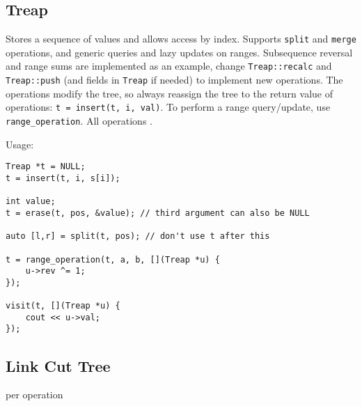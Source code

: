 \subsection{Treap}

Stores a sequence of values and allows access by index. Supports \texttt{split} and \texttt{merge} operations, and generic queries and lazy updates on ranges. Subsequence reversal and range sums are implemented as an example, change \texttt{Treap::recalc} and \texttt{Treap::push} (and fields in \texttt{Treap} if needed) to implement new operations.
The operations modify the tree, so always reassign the tree to the return value of operations: \texttt{t = insert(t, i, val)}. To perform a range query/update, use \texttt{range\_operation}.
All operations .

Usage:
\begin{lstlisting}
Treap *t = NULL;
t = insert(t, i, s[i]);

int value;
t = erase(t, pos, &value); // third argument can also be NULL

auto [l,r] = split(t, pos); // don't use t after this

t = range_operation(t, a, b, [](Treap *u) {
	u->rev ^= 1;
});

visit(t, [](Treap *u) {
	cout << u->val;
});
\end{lstlisting}


\subsection{Link Cut Tree}
 per operation
